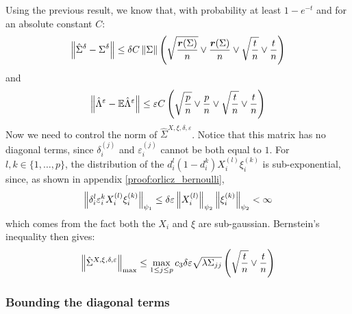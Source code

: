 \documentclass{article}
\numberwithin{equation}{section}
\numberwithin{equation}{section}
\begin{document}
        Using the previous result, we know that, with probability at least $1-e^{-t}$ and for an absolute constant $C$:
        \begin{equation}
            \left\Vert \hat{\Sigma}^\delta - \Sigma^\delta  \right\Vert \leq \delta C \left\Vert \Sigma \right\Vert \left( \sqrt{\frac{\bm{r}(\Sigma)}{n}} \lor \frac{\bm{r}(\Sigma)}{n} \lor \sqrt{\frac{t}{n}} \lor \frac{t}{n}\right)
        \end{equation}
        and
        \begin{equation}
            \left\Vert  \hat{\Lambda}^\varepsilon - \mathbb{E} \hat{\Lambda}^\varepsilon  \right\Vert \leq \varepsilon C  \left( \sqrt{\frac{p}{n}} \lor \frac{p}{n} \lor \sqrt{\frac{t}{n}} \lor \frac{t}{n}\right)
        \end{equation}
        Now we need to control the norm of $\hat{\Sigma}^{X, \xi, \delta, \varepsilon}$. Notice that this matrix has no diagonal terms, since $\delta_i^{(j)}$ and $\varepsilon_i^{(j)}$ cannot be both equal to $1$. For $l,k \in \lbrace 1, \dots, p \rbrace$, the distribution of the $d_i^l (1-d_i^k) X_i^{(l)}\xi_i^{(k)}$ is sub-exponential, since, as shown in appendix \ref{proof:orlicz_bernoulli}, 
        \begin{equation}
            \left\Vert \delta_i^l \varepsilon_i^k X_i^{(l)}\xi_i^{(k)} \right\Vert_{\psi_{1}} \leq \delta \varepsilon \left\Vert X_i^{(l)} \right\Vert_{\psi_{2}} \left\Vert \xi_i^{(k)} \right\Vert_{\psi_{2}} < \infty
        \end{equation}
        which comes from the fact both the $X_i$ and $\xi$ are sub-gaussian. Bernstein's inequality then gives:
        \begin{equation}
            \left\Vert \hat{\Sigma}^{X, \xi, \delta, \varepsilon} \right\Vert_\text{max} \leq \max_{1 \leq j \leq p} c_3 \delta \varepsilon\sqrt{\lambda\Sigma_{jj}} \left( \sqrt{\frac{t}{n}} \lor \frac{t}{n}\right)
        \end{equation}
        
        \subsubsection{Bounding the diagonal terms}
        
\end{document}
